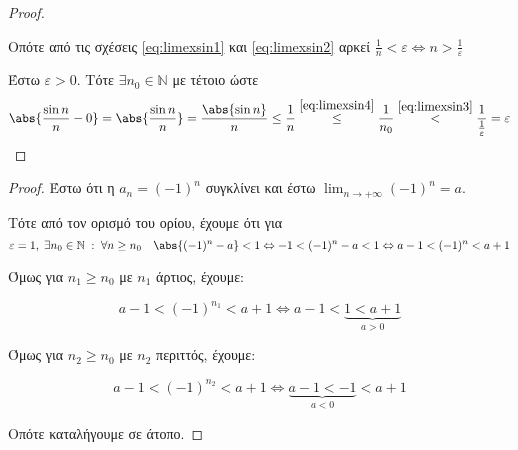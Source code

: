 \documentclass[main.tex]{subfiles}
\begin{document}
\begin{examples}
\begin{enumerate}[i)]
\begin{proof}
\begin{description}
                        Οπότε από τις σχέσεις \eqref{eq:limexsin1} και 
                        \eqref{eq:limexsin2} αρκεί $ \frac{1}{n} < 
                        \varepsilon \Leftrightarrow n > \frac{1}{
                        \varepsilon} $
                \end{description}

                Έστω $ \varepsilon >0 $. Τότε $ \exists n_{0} \in \mathbb{N}
                $ με  τέτοιο ώστε
                \[
                    \abs{\frac{\sin{n}}{n} - 0} =  \abs{\frac{\sin{n}}{n}} =
                    \frac{\abs{\sin{n}}}{n} \leq \frac{1}{n}
                    \overset{\eqref{eq:limexsin4}}{\leq}  \frac{1}{n_{0}}
                    \overset{\eqref{eq:limexsin3}}{<}
                    \frac{1}{\frac{1}{\varepsilon}
                    } = \varepsilon 
                \] 
            \end{proof}
    \end{enumerate}
\end{examples}


\begin{proof}
\item {}
    Έστω ότι η $ a_{n}= (-1)^{n} $ συγκλίνει και έστω $ \lim_{n \to +
    \infty}(-1)^{n} = a $. 

    Τότε από τον ορισμό του ορίου, έχουμε ότι για 
    \[ 
        \varepsilon = 1, \; \exists n_{0} \in \mathbb{N} \; : \; \forall 
        n \geq n_{0} \quad \abs{(-1)^{n}-a} < 1 \Leftrightarrow -1 < 
        (-1)^{n} -a < 1 \Leftrightarrow a-1 < (-1)^{n} < a+1
    \]

    Όμως για $ n_{1} \geq n_{0} $ με $ n_{1} $ άρτιος, έχουμε:

    \[
        a-1 <  (-1)^{n_{1}} < a+1 \Leftrightarrow a-1 < 
        \underbrace{1 < a+1}_{a>0} 
    \] 

    Όμως για $ n_{2} \geq n_{0} $ με $ n_{2} $ περιττός, έχουμε:

    \[
        a-1 <  (-1)^{n_{2}} < a+1 \Leftrightarrow 
        \underbrace{a-1 < -1}_{a<0} < a+1
    \] 

    Οπότε καταλήγουμε σε άτοπο.
\end{proof}


\end{document}

